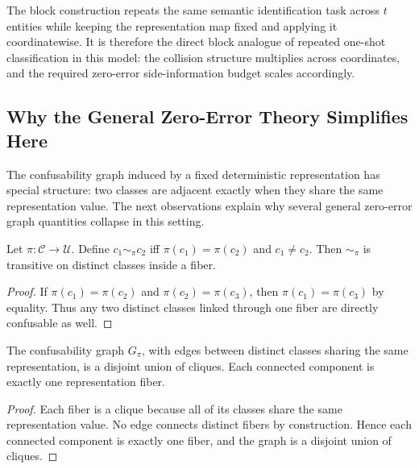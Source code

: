 \begin{remark}
The block construction repeats the same semantic identification task across $t$ entities while keeping the representation map fixed and applying it coordinatewise. It is therefore the direct block analogue of repeated one-shot classification in this model: the collision structure multiplies across coordinates, and the required zero-error side-information budget scales accordingly.
\end{remark}

\subsection{Why the General Zero-Error Theory Simplifies Here}

The confusability graph induced by a fixed deterministic representation has special structure: two classes are adjacent exactly when they share the same representation value. The next observations explain why several general zero-error graph quantities collapse in this setting.

\begin{proposition}
Let $\pi : \mathcal C \to \mathcal U$. Define $c_1 \sim_\pi c_2$ iff $\pi(c_1)=\pi(c_2)$ and $c_1 \ne c_2$. Then $\sim_\pi$ is transitive on distinct classes inside a fiber.
\end{proposition}

\begin{proof}
If $\pi(c_1)=\pi(c_2)$ and $\pi(c_2)=\pi(c_3)$, then $\pi(c_1)=\pi(c_3)$ by equality. Thus any two distinct classes linked through one fiber are directly confusable as well.
\end{proof}

\begin{proposition}
The confusability graph $G_\pi$, with edges between distinct classes sharing the same representation, is a disjoint union of cliques. Each connected component is exactly one representation fiber.
\end{proposition}

\begin{proof}
Each fiber is a clique because all of its classes share the same representation value. No edge connects distinct fibers by construction. Hence each connected component is exactly one fiber, and the graph is a disjoint union of cliques.
\end{proof}

